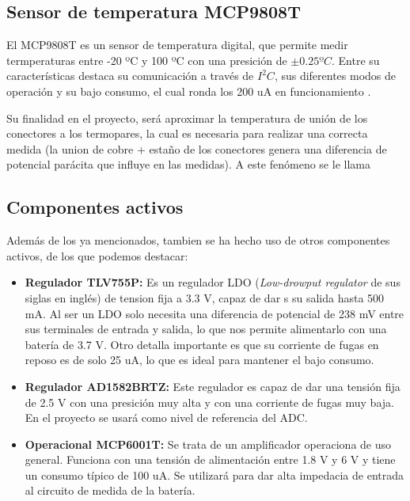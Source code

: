 	
	\subsection{Sensor de temperatura MCP9808T} \label{hard:MCP9808T}
	
	El MCP9808T es un sensor de temperatura digital, que permite medir termperaturas entre -20 ºC y 100 ºC con una presición de  $\pm 0.25 ºC$. Entre su características destaca su comunicación a través de $I^2C$, sus diferentes modos de operación y su bajo consumo, el cual ronda los 200 uA en funcionamiento \citep{MCP9808}.
	
	Su finalidad en el proyecto, será aproximar la temperatura de unión de los conectores a los termopares, la cual es necesaria para realizar una correcta medida (la union de cobre + estaño de los conectores genera una diferencia de potencial parácita que influye en las medidas). A este fenómeno se le llama 
	
	\subsection{Componentes activos} \label{CActive}
	
	Además de los ya mencionados, tambien se ha hecho uso  de otros componentes activos, de los que podemos destacar:
	
	\begin{itemize}
		\item \textbf{Regulador TLV755P: }Es un regulador LDO (\textit{Low-drowput regulator} de sus siglas en inglés) de tension fija a 3.3 V, capaz de dar s su salida hasta 500 mA. Al ser un LDO solo necesita una diferencia de potencial de 238 mV entre sus terminales de entrada y salida, lo que nos permite alimentarlo con una batería de 3.7 V. Otro detalla importante es que su corriente de fugas en reposo es de solo 25 uA, lo que es ideal para mantener el bajo consumo.
		
		\item \textbf{Regulador AD1582BRTZ: }Este regulador es capaz de dar una tensión fija de 2.5 V con una presición muy alta y con una corriente de fugas muy baja. En el proyecto se usará como nivel de referencia del ADC.
		
		\item \textbf{Operacional MCP6001T: }Se trata de un amplificador operaciona de uso general. Funciona con una tensión de alimentación entre 1.8 V y 6 V y tiene un consumo típico de 100 uA. Se utilizará para dar alta impedacia de entrada al circuito de medida de la batería.
		
	\end{itemize}
	
